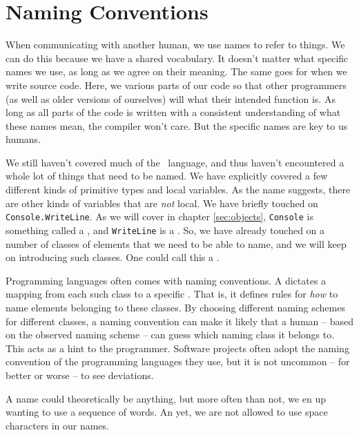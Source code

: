 \section{Naming Conventions}

When communicating with another human, we use names to refer to things. We can do this because we have a shared vocabulary. It doesn't matter what specific names we use, as long as we agree on their meaning. The same goes for when we write source code. Here, we  various parts of our code so that other programmers (as well as older versions of ourselves) will  what their intended function is. As long as all parts of the code is written with a consistent understanding of what these names mean, the compiler won't care. But the specific names are key to us humans.

We still haven't covered much of the \csharp\ language, and thus haven't encountered a whole lot of things that need to be named. We have explicitly covered a few different kinds of primitive types and local variables. As the name suggests, there are other kinds of variables that are \textsl{not} local. We have briefly touched on \texttt{Console.WriteLine}. As we will cover in chapter \ref{sec:objects}, \texttt{Console} is something called a , and \texttt{WriteLine} is a . So, we have already touched on a number of classes of elements that we need to be able to name, and we will keep on introducing such classes. One could call this a .

Programming languages often comes with naming conventions. A  dictates a mapping from each such class to a specific . That is, it defines rules for \textsl{how} to name elements belonging to these classes. By choosing different naming schemes for different classes, a naming convention can make it likely that a human -- based on the observed naming scheme -- can guess which naming class it belongs to. This acts as a hint to the programmer. Software projects often adopt the naming convention of the programming languages they use, but it is not uncommon -- for better or worse -- to see deviations.

A name could theoretically be anything, but more often than not, we en up wanting to use a sequence of words. An yet, we are not allowed to use space characters in our names. 

